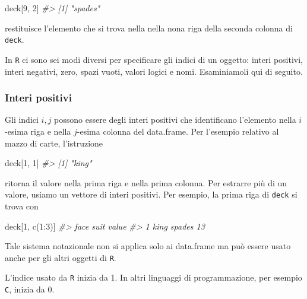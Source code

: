 \documentclass[
]{memoir}
\newenvironment{Shaded}{\begin{snugshade}}{\end{snugshade}}
\newcommand{\CommentTok}[1]{\textcolor[rgb]{0.56,0.35,0.01}{\textit{#1}}}
\newcommand{\DecValTok}[1]{\textcolor[rgb]{0.00,0.00,0.81}{#1}}
\newcommand{\FunctionTok}[1]{\textcolor[rgb]{0.00,0.00,0.00}{#1}}
\newcommand{\NormalTok}[1]{#1}
\newcommand{\SpecialCharTok}[1]{\textcolor[rgb]{0.00,0.00,0.00}{#1}}
\theoremstyle{definition}
\theoremstyle{definition}
\theoremstyle{definition}
\theoremstyle{definition}
\theoremstyle{remark}
\begin{document}
\begin{Shaded}
\begin{Highlighting}[]
\NormalTok{deck[}\DecValTok{9}\NormalTok{, }\DecValTok{2}\NormalTok{]}
\CommentTok{\#\textgreater{} [1] "spades"}
\end{Highlighting}
\end{Shaded}

restituisce l'elemento che si trova nella nella nona riga della seconda
colonna di \texttt{deck}.

In \texttt{R} ci sono sei modi diversi per specificare gli indici di un oggetto:
interi positivi, interi negativi, zero, spazi vuoti, valori logici e
nomi. Esaminiamoli qui di seguito.

\hypertarget{interi-positivi}{%
\subsubsection{Interi positivi}\label{interi-positivi}}

Gli indici \(i, j\) possono essere degli interi positivi che identificano
l'elemento nella \(i\)-esima riga e nella \(j\)-esima colonna del
data.frame. Per l'esempio relativo al mazzo di carte, l'istruzione

\begin{Shaded}
\begin{Highlighting}[]
\NormalTok{deck[}\DecValTok{1}\NormalTok{, }\DecValTok{1}\NormalTok{]}
\CommentTok{\#\textgreater{} [1] "king"}
\end{Highlighting}
\end{Shaded}

ritorna il valore nella prima riga e nella prima colonna. Per estrarre
più di un valore, usiamo un vettore di interi positivi. Per esempio, la
prima riga di \texttt{deck} si trova con

\begin{Shaded}
\begin{Highlighting}[]
\NormalTok{deck[}\DecValTok{1}\NormalTok{, }\FunctionTok{c}\NormalTok{(}\DecValTok{1}\SpecialCharTok{:}\DecValTok{3}\NormalTok{)]}
\CommentTok{\#\textgreater{}   face   suit value}
\CommentTok{\#\textgreater{} 1 king spades    13}
\end{Highlighting}
\end{Shaded}

Tale sistema notazionale non si applica solo ai data.frame ma può essere
usato anche per gli altri oggetti di \texttt{R}.

L'indice usato da \texttt{R} inizia da 1. In altri linguaggi di programmazione,
per esempio \texttt{C}, inizia da 0.
\end{document}
